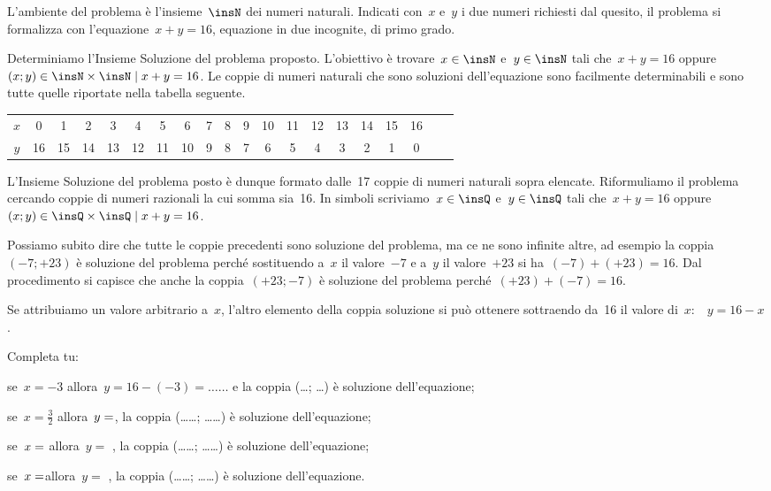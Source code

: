 \begin{soluzione}
L'ambiente del problema è l'insieme~$\insN$ dei numeri naturali. Indicati con~$x$ e~$y$ i due numeri
richiesti dal quesito, il problema si formalizza con l'equazione~$x+y=16$, equazione in due incognite, di
primo grado.

Determiniamo l'Insieme Soluzione del problema proposto.
L'obiettivo è trovare~$x\in\insN$ e~$y\in\insN$ tali che~$x+y=16$ oppure~$(x;y)\in\insN\times\insN\mid x+y=16$.
Le coppie di numeri naturali che sono soluzioni
dell'equazione sono facilmente determinabili e sono
tutte quelle riportate nella tabella seguente.

\begin{tabular}{cccccccccccccccccccc}
\toprule
$x$ & 0 & 1 & 2 & 3 & 4 & 5 & 6 & 7 & 8 & 9 & 10 & 11 & 12 & 13 & 14 & 15 & 16\\
$y$ & 16 & 15 & 14 & 13 & 12 & 11 & 10 & 9 & 8 & 7 & 6 & 5 & 4 & 3 & 2 & 1 & 0\\
\bottomrule
\end{tabular}\vspace{1.10ex}

L'Insieme Soluzione del problema posto è dunque
formato dalle~17 coppie di numeri naturali sopra elencate.
Riformuliamo il problema cercando coppie di numeri razionali la cui
somma sia~16.
In simboli scriviamo~$x\in\insQ$ e~$y\in\insQ$ tali che~$x+y=16$ oppure~$(x;y)\in\insQ\times\insQ\mid  x+y=16$.

Possiamo subito dire che tutte le coppie precedenti sono soluzione del
problema, ma ce ne sono infinite altre, ad esempio la coppia~$(-7;+23)$ è soluzione del problema perché sostituendo a~$x$ il
valore~$-7$ e a~$y$ il valore~$+23$ si ha~$(-7)+(+23)=16$.
Dal procedimento si capisce che anche la coppia~$(+23;-7)$ è
soluzione del problema perché~$(+23)+(-7)=16$.

Se attribuiamo un valore arbitrario a~$x$, l'altro
elemento della coppia soluzione si può ottenere sottraendo da~16 il
valore di~$x$:~~$y=16-x$.

Completa tu:

\begin{itemize*}
\item se~$x=-3$ allora~$y=16-(-3)=\ldots\ldots$ e la coppia (\ldots; \ldots) è soluzione dell'equazione;
\item se~$x=\frac{3}{2}$ allora~$y =\dotfill$, la coppia (\ldots\ldots; \ldots\ldots) è soluzione dell'equazione;
\item se~$x =\dotfill$ allora~$y=$ \dotfill, la coppia (\ldots\ldots; \ldots\ldots) è soluzione dell'equazione;
\item se~$x=\dotfill$allora~$y =$ \dotfill, la coppia (\ldots\ldots; \ldots\ldots) è soluzione dell'equazione.
\end{itemize*}


\end{soluzione}
